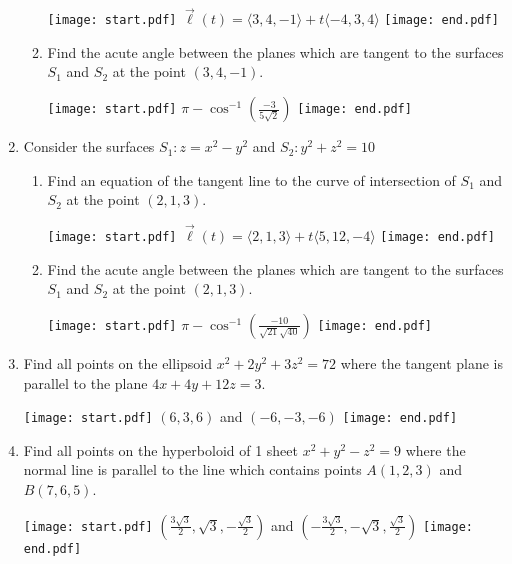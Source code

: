 \documentclass[12pt]{article}
\begin{document}
\begin{enumerate}
\begin{enumerate}
\texttt{[image: start.pdf]}
{{$\overrightarrow{\ell}(t)=\langle 3,4,-1\rangle+t\langle -4,3,4 \rangle$}}
\texttt{[image: end.pdf]}


\item Find the acute angle between the planes which are tangent to the surfaces $S_1$ and $S_2$ at the point $(3,4,-1)$.

\texttt{[image: start.pdf]}
{{$\pi-\cos^{-1}\left(\frac{-3}{5\sqrt{2}}\right)$}}
\texttt{[image: end.pdf]}


\end{enumerate}

\item Consider the surfaces $S_1: z=x^2-y^2$ and $S_2: y^2+z^2=10$

\begin{enumerate}

\item Find an equation of the tangent line to the curve of intersection of $S_1$ and $S_2$ at the point $(2,1,3)$.

\texttt{[image: start.pdf]}
{{$\overrightarrow{\ell}(t)=\langle 2,1,3\rangle+t\langle 5,12,-4 \rangle$}}
\texttt{[image: end.pdf]}


\item Find the acute angle between the planes which are tangent to the surfaces $S_1$ and $S_2$ at the point $(2,1,3)$.

\texttt{[image: start.pdf]}
{{$\pi-\cos^{-1}\left(\frac{-10}{\sqrt{21}\sqrt{40}}\right)$}}
\texttt{[image: end.pdf]}


\end{enumerate}

\item Find all points on the ellipsoid $x^2+2y^2+3z^2=72$ where the tangent plane is parallel to the plane $4x+4y+12z=3$.

\texttt{[image: start.pdf]}
{{$(6,3,6)$ and $(-6,-3,-6)$}}
\texttt{[image: end.pdf]}


\item Find all points on the hyperboloid of 1 sheet $x^2+y^2-z^2=9$ where the normal line is parallel to the line which contains points $A(1,2,3)$ and $B(7,6,5)$.

\texttt{[image: start.pdf]}
{{$\left(\frac{3\sqrt{3}}{2},\sqrt{3},-\frac{\sqrt{3}}{2}\right)$ and $\left(-\frac{3\sqrt{3}}{2},-\sqrt{3},\frac{\sqrt{3}}{2}\right)$}}
\texttt{[image: end.pdf]}



\end{enumerate}
\end{document}
